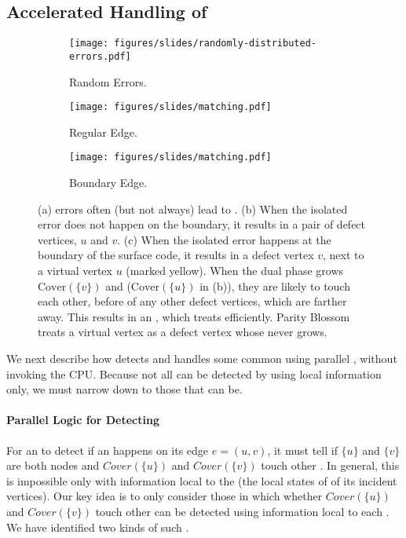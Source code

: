 \subsection{Accelerated Handling of \Isl \conf}\label{ssec:first-order-pre-matching}
\begin{figure}[t]
    \centering
         \begin{subfigure}{.33\linewidth}
             \centering
         \texttt{[image: figures/slides/randomly-distributed-errors.pdf]}
            \caption{Random Errors.}
            \label{fig:randomly-distributed-errors}
        \end{subfigure}
         \begin{subfigure}{.32\linewidth}
             \centering
         \texttt{[image: figures/slides/matching.pdf]}
            \caption{Regular Edge.}
            \label{fig:local-conflict-regular}
        \end{subfigure}
        \begin{subfigure}{.32\linewidth}
            \centering
            \texttt{[image: figures/slides/matching.pdf]}
            \caption{Boundary Edge.}
            \label{fig:local-conflict-boundary}
          \end{subfigure}  
    \caption{(a) \Isl errors often (but not always) lead to \isl \confs.
    (b) When the isolated error does not happen on the boundary, it results in a pair of defect vertices, $u$ and $v$. 
    (c) When the isolated error happens at the boundary of the surface code, it results in a defect vertex $v$, next to a virtual vertex $u$ (marked yellow).
    When the dual phase grows $\text{Cover}(\{v\})$ and ($\text{Cover}(\{u\})$ in (b)),  they are likely to touch each other, before \covs of any other defect vertices, which are farther away. This results in an \isl \conf, which \arch treats efficiently.
    Parity Blossom treats a virtual vertex as a defect vertex whose \cov never grows.}
    \label{fig:conflict-resolution}
\end{figure}

We next describe how \arch detects and handles some common \isl \confs using parallel \pus, without invoking the CPU.
Because not all \isl \confs can be detected by \pus using local information only, we must narrow down to those that can be.

\paragraph{Parallel \pue Logic for Detecting \Isl \confs}
For an \pue to detect if an \isl \conf happens on its edge $e=(u,v)$,
it must tell if $\{u\}$ and $\{v\}$ are both nodes and $Cover(\{u\})$ and $Cover(\{v\})$ touch other \covs.
In general, this is impossible only with information local to the \pue (the local states of \puvs of its incident vertices).
Our key idea is to only consider those \isl \confs in which whether $Cover(\{u\})$ and $Cover(\{v\})$ touch other \covs can be detected using information local to each \pue.
We have identified two kinds of such \isl \confs.

